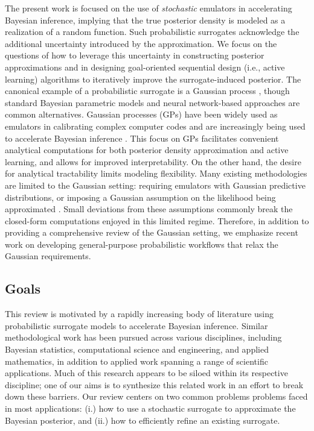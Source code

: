 \documentclass[12pt]{article}
\begin{document}
The present work is focused on the use of \textit{stochastic} emulators in accelerating Bayesian inference,
implying that the true posterior density is modeled as a realization of a random function.
Such probabilistic surrogates acknowledge the additional uncertainty introduced by 
the approximation. We focus on the questions of how to leverage this uncertainty in constructing posterior
approximations and in designing goal-oriented sequential design (i.e., active learning) algorithms
to iteratively improve the surrogate-induced posterior.
The canonical example of a probabilistic surrogate is a Gaussian process \citet{gpML}, though 
standard Bayesian parametric models \citep{BurknerSurrogate} and neural network-based
approaches \citep{deepEnsembles,epistemicNN} are common alternatives.
Gaussian processes (GPs) have been widely used as emulators in calibrating complex
computer codes \citep{design_analysis_computer_experiments,SanterCompExp,gramacy2020surrogates}
and are increasingly being used to accelerate Bayesian inference
\citep{KOH,StuartTeck1,StuartTeck2,VehtariParallelGP,gp_surrogates_random_exploration,
quantileApprox,FerEmulation,KandasamyActiveLearning2015,CES,Kandasamy_2017,
SinsbeckNowak,Surer2023sequential,llikRBF,ranjan2016inverse,weightedIVAR,hydrologicalModel,
VillaniAdaptiveGP,GP_PDE_priors,random_fwd_models,ActiveLearningMCMC,
MCMC_GP_proposal,trainDynamics}.
This focus on GPs facilitates convenient analytical computations for both posterior density approximation and 
active learning, and allows for improved interpretability. On the other hand, the desire for analytical tractability 
limits modeling flexibility. Many existing methodologies are limited to the Gaussian setting: requiring emulators with 
Gaussian predictive distributions, or imposing a Gaussian assumption on the likelihood being approximated
\citep{StuartTeck1,Surer2023sequential,weightedIVAR,hydrologicalModel}.
Small deviations from these assumptions commonly break the closed-form computations enjoyed in this limited regime.
Therefore, in addition to providing a comprehensive review of the Gaussian setting, we emphasize recent work on 
developing general-purpose probabilistic workflows that relax the Gaussian requirements.

\subsection{Goals}
This review is motivated by a rapidly increasing body of literature using probabilistic surrogate models
to accelerate Bayesian inference. Similar methodological work has been pursued across various disciplines, 
including Bayesian statistics, computational science and engineering, and applied mathematics, in 
addition to applied work spanning a range of scientific applications. Much of this research appears to 
be siloed within its respective discipline; one of our aims is to synthesize this related work in an effort to break down
these barriers. Our review centers on two common problems problems faced in most applications: (i.) how to
use a stochastic surrogate to approximate the Bayesian posterior, and (ii.) how to efficiently refine 
an existing surrogate.
\end{document}
